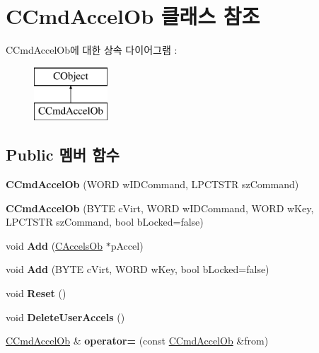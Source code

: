 \hypertarget{class_c_cmd_accel_ob}{}\section{C\+Cmd\+Accel\+Ob 클래스 참조}
\label{class_c_cmd_accel_ob}
C\+Cmd\+Accel\+Ob에 대한 상속 다이어그램 \+: \begin{figure}[H]
\begin{center}
\leavevmode
\includegraphics[height=2.000000cm]{class_c_cmd_accel_ob}
\end{center}
\end{figure}
\subsection*{Public 멤버 함수}
\begin{DoxyCompactItemize}
\item 
\mbox{\label{class_c_cmd_accel_ob_a245369282fbad17c28924e0568fa5bcc}} 
{\bfseries C\+Cmd\+Accel\+Ob} (W\+O\+RD w\+I\+D\+Command, L\+P\+C\+T\+S\+TR sz\+Command)
\item 
\mbox{\label{class_c_cmd_accel_ob_a2c532e999fa7dcb99d7d9b1027cebbef}} 
{\bfseries C\+Cmd\+Accel\+Ob} (B\+Y\+TE c\+Virt, W\+O\+RD w\+I\+D\+Command, W\+O\+RD w\+Key, L\+P\+C\+T\+S\+TR sz\+Command, bool b\+Locked=false)
\item 
\mbox{\label{class_c_cmd_accel_ob_a519f8c7ac935b0d06531589e5427b656}} 
void {\bfseries Add} (\mbox{\hyperlink{class_c_accels_ob}{C\+Accels\+Ob}} $\ast$p\+Accel)
\item 
\mbox{\label{class_c_cmd_accel_ob_a15429015a20179a0e181347f35ad9c58}} 
void {\bfseries Add} (B\+Y\+TE c\+Virt, W\+O\+RD w\+Key, bool b\+Locked=false)
\item 
\mbox{\label{class_c_cmd_accel_ob_ac679e57ed400b175109af50ea2ce919d}} 
void {\bfseries Reset} ()
\item 
\mbox{\label{class_c_cmd_accel_ob_a7040471adc76f057a1d79c9fdfb84fe8}} 
void {\bfseries Delete\+User\+Accels} ()
\item 
\mbox{\label{class_c_cmd_accel_ob_a045ce00d2465fefed857066eef1406a7}} 
\mbox{\hyperlink{class_c_cmd_accel_ob}{C\+Cmd\+Accel\+Ob}} \& {\bfseries operator=} (const \mbox{\hyperlink{class_c_cmd_accel_ob}{C\+Cmd\+Accel\+Ob}} \&from)
\end{DoxyCompactItemize}
